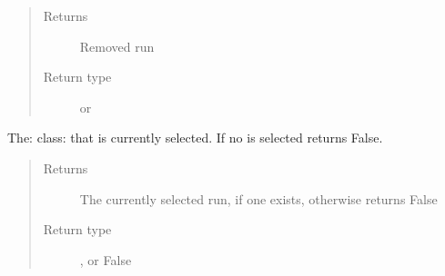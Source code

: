 \documentclass[letterpaper,10pt,english]{sphinxmanual}
\begin{document}
\begin{fulllineitems}
\begin{fulllineitems}
\begin{quote}
\begin{description}
\item[{Returns}] \leavevmode
Removed run

\item[{Return type}] \leavevmode
{\hyperref[\detokenize{polo.crystallography:polo.crystallography.run.Run}]{}} or {\hyperref[\detokenize{polo.crystallography:polo.crystallography.run.HWIRun}]{}}

\end{description}\end{quote}

\end{fulllineitems}


\begin{fulllineitems}
\label{\detokenize{polo.widgets:polo.widgets.run_tree.RunTree.remove_run_signal}}
\end{fulllineitems}


\begin{fulllineitems}
\label{\detokenize{polo.widgets:polo.widgets.run_tree.RunTree.save_run_signal}}
\end{fulllineitems}


\begin{fulllineitems}
\label{\detokenize{polo.widgets:polo.widgets.run_tree.RunTree.selected_run}}
The: class: that is currently selected. If no  is
selected returns False.
\begin{quote}\begin{description}
\item[{Returns}] \leavevmode
The currently selected run, if one exists, otherwise returns False

\item[{Return type}] \leavevmode
{\hyperref[\detokenize{polo.crystallography:polo.crystallography.run.Run}]{}}, {\hyperref[\detokenize{polo.crystallography:polo.crystallography.run.HWIRun}]{}} or False

\end{description}\end{quote}

\end{fulllineitems}


\end{fulllineitems}
\end{document}
